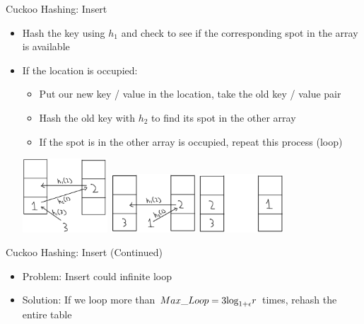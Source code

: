 \documentclass[aspectratio=169]{beamer}
\begin{document}
\begin{frame}{Cuckoo Hashing: Insert}
    \begin{itemize}
        \item Hash the key using $h_1$ and check to see if the corresponding spot in the array is available
        \item If the location is occupied:
        \begin{itemize}
            \item Put our new key / value in the location, take the old key / value pair
            \item Hash the old key with $h_2$ to find its spot in the other array
            \item If the spot is in the other array is occupied, repeat this process (loop)
        \end{itemize}
        \includegraphics[width=0.25\textwidth]{images/insert1.png} \hspace{0.05\textwidth}
        \includegraphics[width=0.25\textwidth]{images/insert2.png} \hspace{0.05\textwidth}
        \includegraphics[width=0.25\textwidth]{images/insert3.png}
    \end{itemize}
\end{frame}

\begin{frame}{Cuckoo Hashing: Insert (Continued)}
    \begin{itemize}
        \item Problem: Insert could infinite loop
        \item Solution: If we loop more than $\emph{Max\_Loop} = 3 \text{log}_{1 + \epsilon}r$ times, rehash the entire table
    \end{itemize}
\end{frame}
\end{document}
